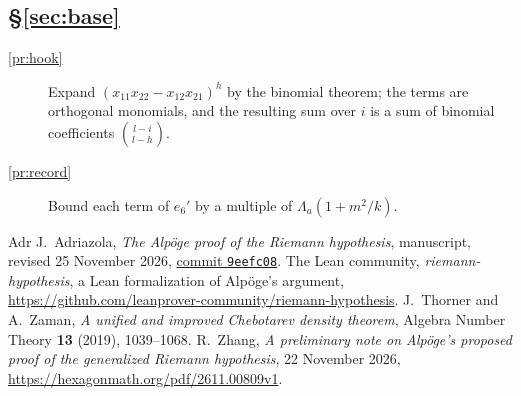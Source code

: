 \documentclass[reqno]{amsart}
\theoremstyle{definition}
\theoremstyle{plain}
\begin{document}
\subsection*{\S\ref{sec:base}}
\begin{description}
\item[\ref{pr:hook}] Expand $(x_{11}x_{22}-x_{12}x_{21})^h$ by the binomial
theorem; the terms are orthogonal monomials, and the resulting sum over $i$
is a sum of binomial coefficients $\binom{l-i}{l-h}$.
\item[\ref{pr:record}] Bound each term of $e_6'$ by a multiple of $\Lambda_a(1+m^2/k)$.
\end{description}

\begin{thebibliography}{Adr}
J.~Adriazola, \emph{The Alp\"oge proof of the Riemann hypothesis}, manuscript, revised 25 November 2026, \href{https://github.com/jimjamzola/RH-Alpoge-Reconstruction/tree/9eefc08b0819728d4dd2ef0568b49a61251af111}{commit \texttt{9eefc08}}.
 The Lean community, \emph{riemann-hypothesis}, a Lean formalization of Alp\"oge's argument, \url{https://github.com/leanprover-community/riemann-hypothesis}.
 J.~Thorner and A.~Zaman, \emph{A unified and improved Chebotarev density theorem},
Algebra Number Theory \textbf{13} (2019), 1039--1068.
 R.~Zhang, \emph{A preliminary note on Alp\"oge's proposed proof of the generalized Riemann hypothesis}, 22 November 2026, \url{https://hexagonmath.org/pdf/2611.00809v1}.
\end{thebibliography}
\end{document}

